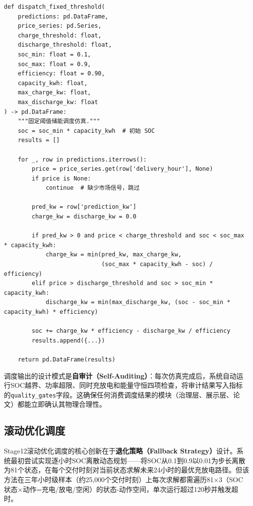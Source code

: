 \documentclass[12pt,a4paper]{ctexbook}
\begin{document}
\begin{lstlisting}[caption={固定阈值调度核心逻辑（精简自 storage.py）}, label={lst:dispatch}]
def dispatch_fixed_threshold(
    predictions: pd.DataFrame,
    price_series: pd.Series,
    charge_threshold: float,
    discharge_threshold: float,
    soc_min: float = 0.1,
    soc_max: float = 0.9,
    efficiency: float = 0.90,
    capacity_kwh: float,
    max_charge_kw: float,
    max_discharge_kw: float
) -> pd.DataFrame:
    """固定阈值储能调度仿真."""
    soc = soc_min * capacity_kwh  # 初始 SOC
    results = []

    for _, row in predictions.iterrows():
        price = price_series.get(row['delivery_hour'], None)
        if price is None:
            continue  # 缺少市场信号，跳过

        pred_kw = row['prediction_kw']
        charge_kw = discharge_kw = 0.0

        if pred_kw > 0 and price < charge_threshold and soc < soc_max * capacity_kwh:
            charge_kw = min(pred_kw, max_charge_kw,
                            (soc_max * capacity_kwh - soc) / efficiency)
        elif price > discharge_threshold and soc > soc_min * capacity_kwh:
            discharge_kw = min(max_discharge_kw, (soc - soc_min * capacity_kwh) * efficiency)

        soc += charge_kw * efficiency - discharge_kw / efficiency
        results.append({...})

    return pd.DataFrame(results)
\end{lstlisting}

调度输出的设计模式是\textbf{自审计（Self-Auditing）}：每次仿真完成后，系统自动运行SOC越界、功率超限、同时充放电和能量守恒四项检查，将审计结果写入指标的\texttt{quality\_gates}字段。这确保任何消费调度结果的模块（治理层、展示层、论文）都能立即确认其物理合理性。\cite{bess-review-2023,milp-dispatch-2021}

\subsection{滚动优化调度}

Stage12滚动优化调度的核心创新在于\textbf{退化策略（Fallback Strategy）}设计。系统最初尝试实现逐小时SOC离散动态规划——将SOC从0.1到0.9以0.01为步长离散为81个状态，在每个交付时刻对当前状态求解未来24小时的最优充放电路径。但该方法在三年小时级样本（约25,000个交付时刻）上每次求解都需遍历81×3（SOC状态×动作=充电/放电/空闲）的状态-动作空间，单次运行超过120秒并触发超时。\cite{bo-two-stage-rolling-2025,li-mpc-microgrid-2025,design-patterns}
\end{document}
